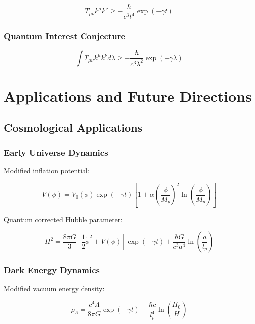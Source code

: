 \documentclass[12pt]{article}
\theoremstyle{plain}
\theoremstyle{definition}
\theoremstyle{remark}
\begin{document}
\begin{equation}
T_{\mu\nu}k^\mu k^\nu \geq -\frac{\hbar}{c^3t^4}\exp(-\gamma t)
\end{equation}

\subsubsection{Quantum Interest Conjecture}

\begin{equation}
\int T_{\mu\nu}k^\mu k^\nu d\lambda \geq -\frac{\hbar}{c^3\lambda^2}\exp(-\gamma\lambda)
\end{equation}
\section{Applications and Future Directions}

\subsection{Cosmological Applications}

\subsubsection{Early Universe Dynamics}

Modified inflation potential:

\begin{equation}
V(\phi) = V_0(\phi)\exp(-\gamma t)\left[1 + \alpha\left(\frac{\phi}{M_p}\right)^2\ln\left(\frac{\phi}{M_p}\right)\right]
\end{equation}

Quantum corrected Hubble parameter:

\begin{equation}
H^2 = \frac{8\pi G}{3}\left[\frac{1}{2}\dot{\phi}^2 + V(\phi)\right]\exp(-\gamma t) + \frac{\hbar G}{c^3a^4}\ln\left(\frac{a}{l_p}\right)
\end{equation}

\subsubsection{Dark Energy Dynamics}

Modified vacuum energy density:

\begin{equation}
\rho_{\Lambda} = \frac{c^4\Lambda}{8\pi G}\exp(-\gamma t) + \frac{\hbar c}{l_p^4}\ln\left(\frac{H_0}{H}\right)
\end{equation}
\end{document}
